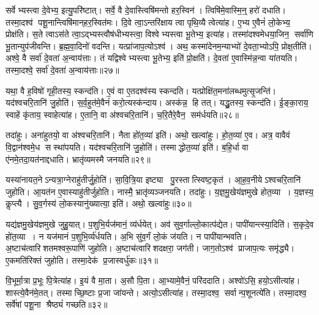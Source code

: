सर्वेभ्यस्त्वा दे॒वेभ्य॒ इत्यु॒परि॑ष्टात्।
सर्वे॒ वै दे॒वास्त्विषि॑मन्तो हर॒स्विन॑।
त्विषि॑मे॒वास्मि॒न्॒ हरो॑ दधाति।
तस्मा॒दश्व॑ पशू॒नान्त्विषि॑मान्‌हर॒स्वित॑मः।
दि॒वे त्वा॒ऽन्तरि॑क्षाय त्वा पृथि॒व्यै त्वेत्या॑ह।
ए॒भ्य ए॒वैनं॑ लो॒केभ्य॒ प्रोक्ष॑ति।
स॒ते त्वाऽस॑ते त्वा॒ऽद्भ्यस्त्वौष॑धीभ्यस्त्वा॒ विश्वेभ्यस्त्वा भू॒तेभ्य॒ इत्या॑ह।
तस्मा॑दश्वमेधया॒जिन॒ सर्वा॑णि भू॒तान्युप॑जीवन्ति।
ब्र॒ह्म॒वा॒दिनो॑ वदन्ति।
यत्प्रा॑जाप॒त्योऽश्व॑।
अथ॒ कस्मा॑देनम॒न्याभ्यो॑ दे॒वता॒भ्योऽपि॒ प्रोक्ष॒तीति॑।
अश्वे॒ वै सर्वा॑ दे॒वता॑ अ॒न्वाय॑त्ताः।
तं यद्विश्वेभ्यस्त्वा भू॒तेभ्य॒ इति॑ प्रो॒क्षति॑।
दे॒वता॑ ए॒वास्मि॑न्न॒न्वा या॑तयति।
तस्मा॒दश्वे॒ सर्वा॑ दे॒वता॑ अ॒न्वाय॑त्ताः॥२७॥\anuvakamend[सा॒र॒सा॒रित॒मोऽप॑चिततमः प्राजाप॒त्योऽश्व॒ पञ्च॑ च]

यथा॒ वै ह॒विषो॑ गृही॒तस्य॒ स्कन्द॑ति।
ए॒वं वा ए॒तदश्व॑स्य स्कन्दति।
यत्प्रोक्षि॑त॒मना॑लब्धमुत्सृ॒जन्ति॑।
यद॑श्वचरि॒तानि॑ जु॒होति॑।
स॒र्व॒हुत॑मे॒वैनं॑ करो॒त्यस्क॑न्दाय।
अस्क॑न्न॒ हि तत्।
यद्धु॒तस्य॒ स्कन्द॑ति।
ई॒ङ्का॒राय॒ स्वाहें कृ॑ताय॒ स्वाहेत्या॑ह।
ए॒तानि॒ वा अ॑श्वचरि॒तानि॑।
च॒रि॒तैरे॒वैन॒ सम॑र्धयति॥२८॥

तदा॑हुः।
अना॑हुतयो॒ वा अ॑श्वचरि॒तानि॑।
नैता हो॑त॒व्या॑ इति॑।
अथो॒ खल्वा॑हुः।
हो॒त॒व्या॑ ए॒व।
अत्र॒ वावैवं वि॒द्वान॑श्वमे॒ध सस्था॑पयति।
यद॑श्वचरि॒तानि॑ जु॒होति॑।
तस्माद्धोत॒व्या॑ इति॑।
ब॒हि॒र्धा वा ए॑नमे॒तदा॒यत॑नाद्दधाति।
भ्रातृ॑व्यमस्मै जनयति॥२९॥

यस्या॑नायत॒नेऽन्यत्रा॒ग्नेराहु॑तीर्जु॒होति॑।
सा॒वि॒त्रि॒या इष्ट्या पु॒रस्तात्स्विष्ट॒कृत॑।
आ॒ह॒व॒नीयेऽश्वचरि॒तानि॑ जुहोति।
आ॒यत॑न ए॒वास्याहु॑तीर्जुहोति।
नास्मै॒ भ्रातृ॑व्यञ्जनयति।
तदा॑हुः।
य॒ज्ञ॒मु॒खेय॑ज्ञमुखे होत॒व्या।
य॒ज्ञस्य॒ कॢप्त्यै।
सु॒व॒र्गस्य॑ लो॒कस्यानु॑ख्यात्या॒ इति॑।
अथो॒ खल्वा॑हुः॥३०॥

यद्य॑ज्ञमु॒खेय॑ज्ञमुखे जुहु॒यात्।
प॒शुभि॒र्यज॑मानं॒ व्य॑र्धयेत्।
अव॑ सुव॒र्गाल्लो॒कात्प॑द्येत।
पापी॑यान्त्स्या॒दिति॑।
स॒कृदे॒व हो॑त॒व्या।
न यज॑मानं प॒शुभि॒र्व्य॑र्धयति।
अ॒भि सु॑व॒र्गं लो॒कं ज॑यति।
न पापी॑यान्भवति।
अ॒ष्टाच॑त्वारिशतमश्वरू॒पाणि॑ जुहोति।
अ॒ष्टाच॑त्वारिशदक्षरा॒ जग॑ती।
जाग॒तोऽश्व॑ प्राजाप॒त्यः समृ॑द्ध्यै।
ए॒कमति॑रिक्तं जुहोति।
तस्मा॒देक॑ प्र॒जास्वर्धु॑कः॥३१॥\anuvakamend[अ॒र्ध॒य॒ति॒ ज॒न॒य॒ति॒ खल्वा॑हु॒र्जग॑ती॒ त्रीणि॑ च]

वि॒भूर्मा॒त्रा प्र॒भूः पि॒त्रेत्या॑ह।
इ॒यं वै मा॒ता।
अ॒सौ पि॒ता।
आ॒भ्यामे॒वैनं॒ परि॑ददाति।
अश्वो॑ऽसि॒ हयो॒ऽसीत्या॑ह।
शास्त्ये॒वैन॑मे॒तत्।
तस्माच्छि॒ष्टाः प्र॒जा जा॑यन्ते।
अत्यो॒ऽसीत्या॑ह।
तस्मा॒दश्व॒ सर्वान्प॒शूनत्ये॑ति।
तस्मा॒दश्व॒ सर्वे॑षां पशू॒ना श्रैष्ठ्यं॑ गच्छति॥३२॥


